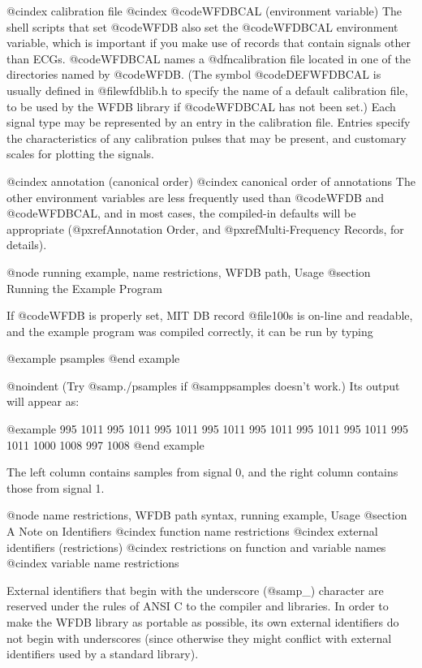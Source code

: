 {{@cindex calibration file
@cindex @code{WFDBCAL} (environment variable)
The shell scripts that set @code{WFDB} also set the @code{WFDBCAL}
environment variable, which is important if you make use of records that
contain signals other than ECGs.  @code{WFDBCAL} names a
@dfn{calibration file} located in one of the directories named by
@code{WFDB}.  (The symbol @code{DEFWFDBCAL} is usually defined in
@file{wfdblib.h} to specify the name of a default calibration file, to
be used by the WFDB library if @code{WFDBCAL} has not been set.)  Each
signal type may be represented by an entry in the calibration file.
Entries specify the characteristics of any calibration pulses that may
be present, and customary scales for plotting the signals.

@cindex annotation (canonical order)
@cindex canonical order of annotations
The other environment variables are less frequently used than @code{WFDB}
and @code{WFDBCAL}, and in most cases, the compiled-in defaults will be
appropriate (@pxref{Annotation Order}, and @pxref{Multi-Frequency Records},
for details).

@node     running example, name restrictions, WFDB path, Usage
@section Running the Example Program

If @code{WFDB} is properly set, MIT DB record @file{100s} is on-line and
readable, and the example program was compiled correctly, it can be run
by typing

@example
psamples
@end example

@noindent
(Try @samp{./psamples} if @samp{psamples} doesn't work.)  Its output
will appear as:

@example
995     1011
995     1011
995     1011
995     1011
995     1011
995     1011
995     1011
995     1011
1000    1008
997     1008
@end example

The left column contains samples from signal 0, and the right column
contains those from signal 1.

@node     name restrictions, WFDB path syntax, running example, Usage
@section A Note on Identifiers
@cindex function name restrictions
@cindex external identifiers (restrictions)
@cindex restrictions on function and variable names
@cindex variable name restrictions

External identifiers that begin with the underscore (@samp{_}) character
are reserved under the rules of ANSI C to the compiler and libraries.
In order to make the WFDB library as portable as possible, its own external
identifiers do not begin with underscores (since otherwise they might
conflict with external identifiers used by a standard library).

}}
